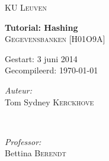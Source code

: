 \begin{titlepage}
\thispagestyle{empty}
\newcommand{\HRule}{\rule{\linewidth}{0.5mm}}
\center
\textsc{\LARGE KU Leuven}\\[1.5cm]
\vfill


{ \Huge \bfseries Tutorial: Hashing}\\[0.4cm]
\textsc{\large Gegevensbanken [H01O9A]}\\[0.5cm]

\vspace{5cm}

\begin{Large}
Gestart: 3 juni 2014\\
Gecompileerd: \today\\
\end{Large}
\vspace{5cm}

\begin{minipage}{0.4\textwidth}
\begin{flushleft} \large
\emph{Auteur:}\\
Tom Sydney \textsc{Kerckhove}
\end{flushleft}
\end{minipage}
~
\begin{minipage}{0.4\textwidth}
\begin{flushright} \large
\emph{Professor:} \\
Bettina \textsc{Berendt}\\
\end{flushright}
\end{minipage}\\[4cm]

\vfill

\end{titlepage}